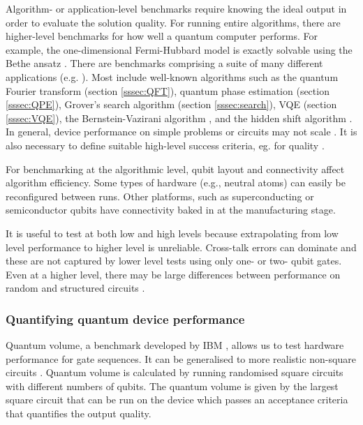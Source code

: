 \documentclass[10pt]{iopart}
\begin{document}
Algorithm- \cite{Georgopoulos2021} or application-level \cite{Lubinski2023,Donkers2022} benchmarks require knowing the ideal output in order to evaluate the solution quality. For running entire algorithms, there are higher-level benchmarks for how well a quantum computer performs. For example, the one-dimensional Fermi-Hubbard model is exactly solvable using the Bethe ansatz \cite{DallaireDemers2020}. There are benchmarks comprising a suite of many different applications (e.g. \cite{Cornelissen2021,Tomesh2022,Murali2019}). Most include well-known algorithms such as the quantum Fourier transform (section \ref{sssec:QFT}), quantum phase estimation (section \ref{sssec:QPE}), Grover's search algorithm (section \ref{sssec:search}), VQE (section \ref{sssec:VQE}), the Bernstein-Vazirani algorithm \cite{Bernstein1993}, and the hidden shift algorithm \cite{vanDam2006}. In general, device performance on simple problems or circuits may not scale \cite{Lubinski2023}. It is also necessary to define suitable high-level success criteria, eg. for quality \cite{BlumeKohout2020,Mills2021}. 

For benchmarking at the algorithmic level, qubit layout and connectivity affect algorithm efficiency. Some types of hardware (e.g., neutral atoms) can easily be reconfigured between runs. Other platforms, such as superconducting or semiconductor qubits have connectivity baked in at the manufacturing stage. 

It is useful to test at both low and high levels because extrapolating from low level performance to higher level is unreliable. Cross-talk errors can dominate and these are not captured by lower level tests using only one- or two- qubit gates.  Even at a higher level, there may be large differences between performance on random and structured circuits \cite{Lubinski2023,Proctor2022}. 


\subsubsection{Quantifying quantum device performance}\label{sec:quantifyperformance}\hfill

Quantum volume, a benchmark developed by IBM \cite{Cross2019}, allows us to test hardware performance for gate sequences. It can be generalised to more realistic non-square circuits \cite{BlumeKohout2020,Miller2022}. Quantum volume is calculated by running randomised square circuits with different numbers of qubits. The quantum volume is given by the largest square circuit that can be run on the device which passes an acceptance criteria that quantifies the output quality. 
\end{document}
